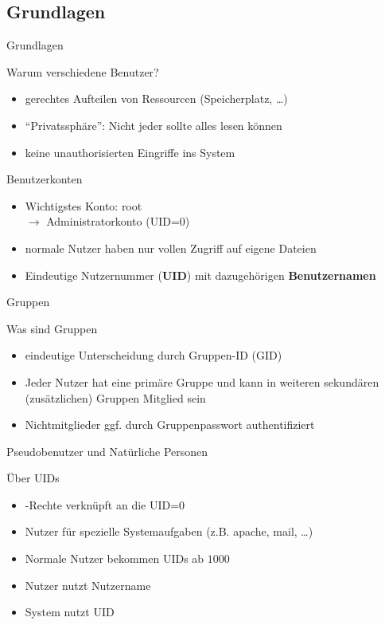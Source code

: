\documentclass[aspectratio=43]{beamer}
\begin{document}
\subsection{Grundlagen}
\begin{frame}{Grundlagen}
  \begin{block}{Warum verschiedene Benutzer?}
    \begin{itemize}
      \item gerechtes Aufteilen von Ressourcen (Speicherplatz, \dots)
      \item ``Privatssphäre'': Nicht jeder sollte alles lesen können
      \item keine unauthorisierten Eingriffe ins System
    \end{itemize}
  \end{block}
  \begin{block}{Benutzerkonten}
    \begin{itemize}
      \item Wichtigstes Konto: root \\$\rightarrow$ Administratorkonto (UID=0)
      \item normale Nutzer haben nur vollen Zugriff auf eigene Dateien
      \item Eindeutige Nutzernummer (\textbf{UID}) mit dazugehörigen \textbf{Benutzernamen}
    \end{itemize}
  \end{block}
\end{frame}

\begin{frame}{Gruppen}
  \begin{block}{Was sind Gruppen}
    \begin{itemize}
      \item eindeutige Unterscheidung durch Gruppen-ID (GID)
      \item Jeder Nutzer hat eine primäre Gruppe
            und kann in weiteren sekundären (zusätzlichen) Gruppen Mitglied sein
      \item Nichtmitglieder ggf. durch Gruppenpasswort authentifiziert
    \end{itemize}
  \end{block}
\end{frame}

\begin{frame}{Pseudobenutzer und Natürliche Personen}
  \begin{block}{Über UIDs}
    \begin{itemize}
      \item {}-Rechte verknüpft an die UID=0
      \item Nutzer für spezielle Systemaufgaben (z.B. apache, mail, \dots)
      \item Normale Nutzer bekommen UIDs ab $1000$
      \item Nutzer nutzt Nutzername
      \item System nutzt UID
    \end{itemize}
  \end{block}
\end{frame}
\end{document}
